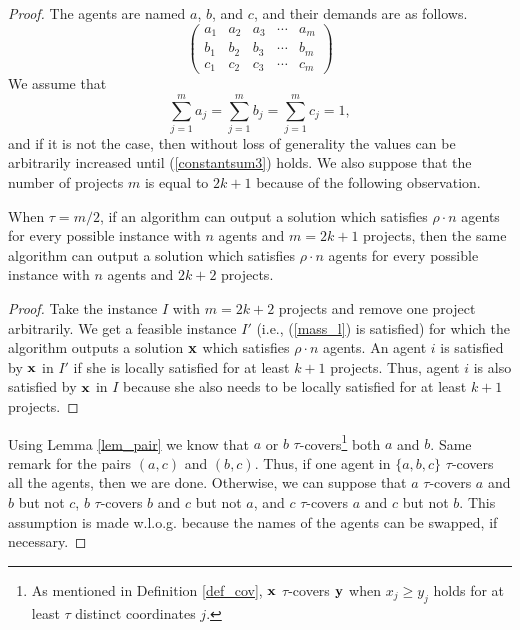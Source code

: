 \documentclass{article}
\begin{document}
\begin{proof} The agents are named $a$, $b$, and $c$, and their demands are as follows.
\begin{equation} \label{gmatrix} 
\left( \begin{array}{ccccc}
a_1 & a_2 & a_3 &\cdots&a_m\\
b_1 & b_2 & b_3 &\cdots&b_m\\
c_1 & c_2 & c_3 &\cdots&c_m  
\end{array} \right)
\end{equation}
We assume that  
\begin{equation} \label{constantsum3}
\sum_{j=1}^m a_j=\sum_{j=1}^m b_j =\sum_{j=1}^m c_j=1,
\end{equation}
and if it is not the case, then without loss of generality the values can be arbitrarily increased until (\ref{constantsum3}) holds. We also suppose that the number of projects $m$ is equal to $2k+1$ because of the following observation. 

\begin{observation} When $\tau=m/2$, if an algorithm can output a solution 
which satisfies $\rho \cdot n$ agents for every possible instance with $n$ agents and $m=2k+1$ projects, then the same algorithm can output a solution which satisfies $\rho \cdot n$ agents for every possible instance with $n$ agents and $2k+2$ projects.   
\end{observation}
\begin{proof} Take the instance $I$ with $m=2k+2$ projects and remove one project arbitrarily. We get a feasible instance $I'$ (i.e., (\ref{mass_l}) is satisfied) for which the algorithm outputs a solution ${\bf x}$ which satisfies $\rho \cdot n$ agents. An agent $i$ is satisfied by ${\bf x}$ in $I'$ if she is locally satisfied for at least $k+1$ projects. Thus, agent $i$ is also satisfied by ${\bf x}$ in $I$ because she also needs to be locally satisfied for at least $k+1$ projects. \end{proof}



Using Lemma \ref{lem_pair} we know that $a$ or $b$ $\tau$-covers\footnote{As mentioned in Definition \ref{def_cov},  ${\bf x}$ $\tau$-covers ${\bf y}$ when $x_j \ge y_j$ holds for at least $\tau$ distinct coordinates $j$.}
 both $a$ and $b$. Same remark for the pairs $(a,c)$ and $(b,c)$. %
Thus, if one agent in $\{a,b,c\}$ $\tau$-covers all the agents, then we are done. Otherwise, we can suppose that $a$ $\tau$-covers $a$ and $b$ but not $c$, $b$ $\tau$-covers $b$ and $c$ but not $a$, and $c$ $\tau$-covers $a$ and $c$ but not $b$. This assumption is made w.l.o.g. because the names of the agents can be swapped, if necessary. 



\end{proof}
\end{document}
